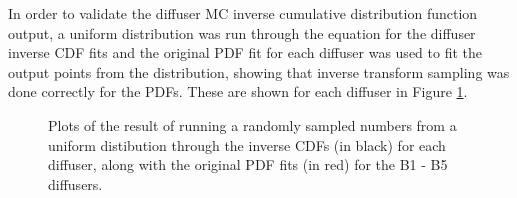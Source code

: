 In order to validate the diffuser MC inverse cumulative distribution function output, a uniform distribution was run through the equation for the diffuser inverse CDF fits and the original PDF fit for each diffuser was used to fit the output points from the distribution, showing that inverse transform sampling was done correctly for the PDFs. These are shown for each diffuser in Figure \ref{fig:inv_cdf_check}. 

\begin{figure}[!htbp]
    \centering
    
    \caption{Plots of the result of running a randomly sampled numbers from a uniform distibution through the inverse CDFs (in black) for each diffuser, along with the original PDF fits (in red) for the B1 - B5 diffusers.}\label{fig:inv_cdf_check}
    
    \hfill
    \hfill
    
    \hspace*{0.005\textwidth}%
    
\end{figure}

